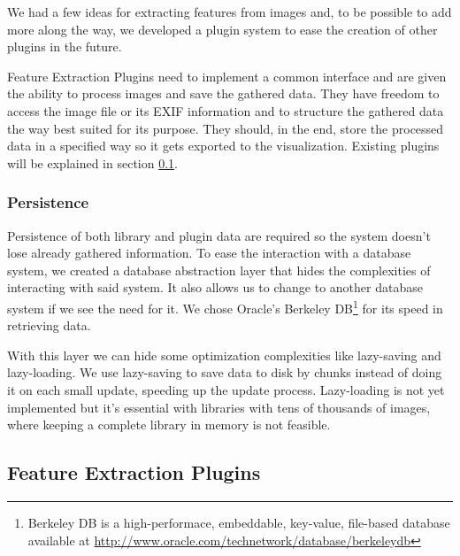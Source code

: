 We had a few ideas for extracting features from images and, to be possible to add more along the way, we developed a plugin system to ease the creation of other plugins in the future.

Feature Extraction Plugins need to implement a common interface and are given the ability to process images and save the gathered data. They have freedom to access the image file or its \ac{EXIF} information and to structure the gathered data the way best suited for its purpose. They should, in the end, store the processed data in a specified way so it gets exported to the visualization. Existing plugins will be explained in section \ref{sub:plugins}.





\subsubsection{Persistence} %
\label{ssub:Persistence}

Persistence of both library and plugin data are required so the system doesn't lose already gathered information. To ease the interaction with a database system, we created a database abstraction layer that hides the complexities of interacting with said system. It also allows us to change to another database system if we see the need for it. We chose Oracle's Berkeley DB\footnote{Berkeley DB is a high-performace, embeddable, key-value, file-based database available at \url{http://www.oracle.com/technetwork/database/berkeleydb}} for its speed in retrieving data.

With this layer we can hide some optimization complexities like lazy-saving and lazy-loading. We use lazy-saving to save data to disk by chunks instead of doing it on each small update, speeding up the update process. Lazy-loading is not yet implemented but it's essential with libraries with tens of thousands of images, where keeping a complete library in memory is not feasible.














\subsection{Feature Extraction Plugins} %
\label{sub:plugins}

